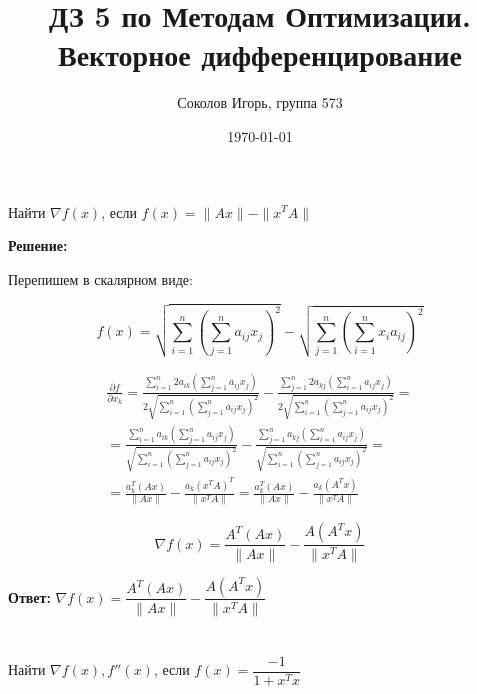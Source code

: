 \documentclass[a4paper,12pt]{article}
\author{Соколов Игорь, группа 573}
\title{ДЗ 5 по Методам Оптимизации. \newline Векторное дифференцирование}
\date{\today}
\newcommand{\lt}{\left}
\newcommand{\rt}{\right}
\newcommand{\p}{\partial}
\newcommand{\fr}{\frac}
\newcommand{\dfr}{\dfrac}
\begin{document}

\maketitle


\section{}

Найти $\nabla f(x)$, если $f(x) = \|Ax\| - \|x^TA\|$

\vspace{\baselineskip}

\textbf{Решение:}

\vspace{\baselineskip}

Перепишем в скалярном виде:

$$f(x) = \sqrt{\sum\limits_{i=1}^n\lt(\sum\limits_{j=1}^n a_{ij}x_j\rt)^2} - \sqrt{\sum\limits_{j=1}^n\lt(\sum\limits_{i=1}^n x_ia_{ij}\rt)^2}$$


\begin{multline}
\fr{\p f}{\p x_k} = \fr{\sum\limits_{i=1}^n 2a_{ik}\lt(\sum\limits_{j=1}^n a_{ij}x_j\rt)}{2\sqrt{\sum\limits_{i=1}^n\lt(\sum\limits_{j=1}^n a_{ij}x_j\rt)^2}}
- 
\fr{\sum\limits_{j=1}^n 2a_{kj}\lt(\sum\limits_{i=1}^n a_{ij}x_j\rt)}{2\sqrt{\sum\limits_{i=1}^n\lt(\sum\limits_{j=1}^n a_{ij}x_j\rt)^2}} =\\= 
\fr{\sum\limits_{i=1}^n a_{ik}\lt(\sum\limits_{j=1}^n a_{ij}x_j\rt)}{\sqrt{\sum\limits_{i=1}^n\lt(\sum\limits_{j=1}^n a_{ij}x_j\rt)^2}}
- 
\fr{\sum\limits_{j=1}^n a_{kj}\lt(\sum\limits_{i=1}^n a_{ij}x_j\rt)}{\sqrt{\sum\limits_{i=1}^n\lt(\sum\limits_{j=1}^n a_{ij}x_j\rt)^2}}
=\\= \fr{a_k^T\lt(Ax\rt)}{\|Ax\|} - \fr{a_k(x^TA)^T}{\|x^TA\|} = \fr{a_k^T\lt(Ax\rt)}{\|Ax\|} - \fr{a_k(A^Tx)}{\|x^TA\|} 
\end{multline}

$$\nabla f(x) = \fr{A^T\lt(Ax\rt)}{\|Ax\|} - \fr{A(A^Tx)}{\|x^TA\|} $$

\textbf{Ответ:} $\nabla f(x) = \dfr{A^T\lt(Ax\rt)}{\|Ax\|} - \dfr{A(A^Tx)}{\|x^TA\|} $

\section{}

Найти $\nabla f(x), f''(x)$, если $f(x) = \dfrac{-1}{1 + x^Tx}$
\end{document}
